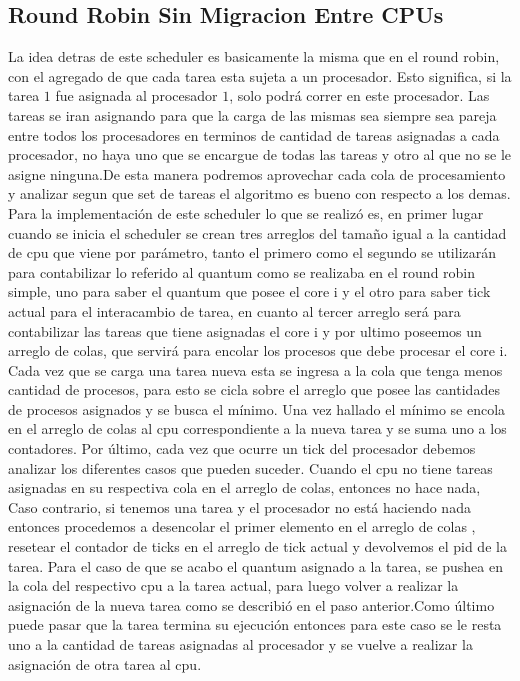\subsection{Round Robin Sin Migracion Entre CPUs}
La idea detras de este scheduler es basicamente la misma que en el round robin, con el agregado de que cada tarea esta sujeta a un procesador. Esto significa, si la tarea $1$ fue asignada al procesador $1$, solo podrá correr en este procesador. Las tareas se iran asignando para que la carga de las mismas sea siempre sea  pareja entre todos los procesadores en terminos de cantidad de tareas asignadas a cada procesador, no haya uno que se encargue de todas las tareas y otro al que no se le asigne ninguna.De esta manera podremos aprovechar cada cola de procesamiento y analizar segun que set de tareas el algoritmo es bueno con respecto a los demas.
\\
Para la implementación de este scheduler lo que se realizó es, en primer lugar cuando se inicia el scheduler se crean tres arreglos del tamaño igual a la cantidad de cpu que viene por parámetro, tanto el primero como el segundo  se utilizarán para contabilizar lo referido al quantum como se realizaba en el round robin simple, uno para saber el quantum que posee el core i y el otro para saber tick actual para el interacambio de tarea, en cuanto al tercer arreglo será para contabilizar las tareas que tiene asignadas el core i y por ultimo poseemos un arreglo de colas, que servirá para encolar los procesos que debe procesar el core i.
Cada vez que se carga una tarea nueva esta se ingresa a la cola que tenga menos cantidad de procesos, para esto se cicla sobre el arreglo que posee las cantidades de procesos asignados y se busca el mínimo. Una vez  hallado el mínimo se encola en el arreglo de colas al cpu correspondiente a la nueva tarea y se suma uno a los contadores.
Por último, cada vez que ocurre un tick del procesador debemos analizar los diferentes casos que pueden suceder. Cuando el cpu no tiene tareas asignadas en su respectiva cola en el arreglo de colas, entonces no hace nada, Caso contrario, si tenemos una tarea y el procesador no está haciendo nada entonces procedemos a desencolar el primer elemento en el arreglo de colas , resetear el contador de ticks en el arreglo de tick actual y devolvemos el pid de la tarea. Para el caso de que se acabo el quantum asignado a la tarea, se pushea en la cola del respectivo cpu a la tarea actual, para luego volver a realizar la asignación de la nueva tarea como se describió en el paso anterior.Como último puede pasar que la tarea termina su ejecución entonces para este caso se le resta uno a la cantidad de tareas asignadas al procesador y se vuelve a realizar la asignación de otra tarea al cpu.
